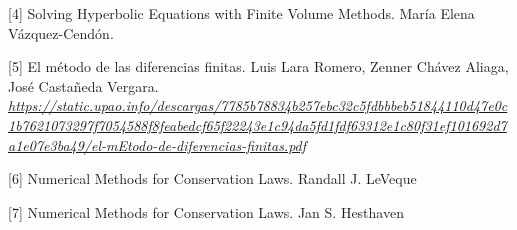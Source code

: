 \documentclass[
]{article}
\begin{document}
{[}4{]} Solving Hyperbolic Equations with Finite Volume Methods. María
Elena Vázquez-Cendón.

{[}5{]} El método de las diferencias finitas. Luis Lara Romero, Zenner
Chávez Aliaga, José Castañeda Vergara.
\href{https://static.upao.info/descargas/7785b78834b257ebc32c5fdbbbeb51844110d47e0c1b7621073297f7054588f8feabedcf65f22243e1c94da5fd1fdf63312e1c80f31ef101692d7a1e07e3ba49/el-mEtodo-de-diferencias-finitas.pdf}{\emph{\emph{https://static.upao.info/descargas/7785b78834b257ebc32c5fdbbbeb51844110d47e0c1b7621073297f7054588f8feabedcf65f22243e1c94da5fd1fdf63312e1c80f31ef101692d7a1e07e3ba49/el-mEtodo-de-diferencias-finitas.pdf}}}

{[}6{]} Numerical Methods for Conservation Laws. Randall J. LeVeque

{[}7{]} Numerical Methods for Conservation Laws. Jan S. Hesthaven
\end{document}
